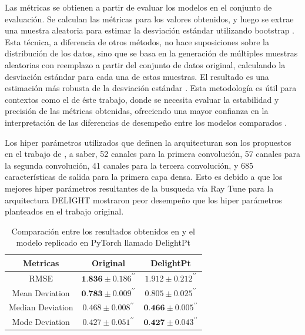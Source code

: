 \documentclass[../tesis.tex]{subfiles}
\begin{document}
Las métricas se obtienen a partir de evaluar los modelos en el conjunto de evaluación. Se calculan las métricas para los valores obtenidos, y luego se extrae una muestra aleatoria para estimar la desviación estándar utilizando bootstrap \cite{bootstrap_std}. Esta técnica, a diferencia de otros métodos, no hace suposiciones sobre la distribución de los datos, sino que se basa en la generación de múltiples muestras aleatorias con reemplazo a partir del conjunto de datos original, calculando la desviación estándar para cada una de estas muestras. El resultado es una estimación más robusta de la desviación estándar \cite{bootstrap_applications}. Esta metodología es útil para contextos como el de éste trabajo, donde se necesita evaluar la estabilidad y precisión de las métricas obtenidas, ofreciendo una mayor confianza en la interpretación de las diferencias de desempeño entre los modelos comparados \cite{bootstrap_methods_and_permutation_tests}.\par\null\par

Los hiper parámetros utilizados que definen la arquitecturan son los propuestos en el trabajo de \cite{delight}, a saber, 52 canales para la primera convolución, 57 canales para la segunda convolución, 41 canales para la tercera convolución, y 685 características de salida para la primera capa densa. Esto es debido a que los mejores hiper parámetros resultantes de la busqueda vía Ray Tune \cite{raytune} para la arquitectura DELIGHT mostraron peor desempeño que los hiper parámetros planteados en el trabajo original.\par\null\par


\begin{table}[h]
    \centering
    \begin{tabular}{|c|c|c|}
        \hline
        Metricas & Original & DelightPt \\ \hline
        RMSE & $\textbf{1.836} \pm 0.186^{\prime \prime}$ & $1.912 \pm 0.212^{\prime \prime}$ \\ \hline
        Mean Deviation & $\textbf{0.783} \pm 0.009^{\prime \prime}$ & $0.805 \pm 0.025^{\prime \prime}$ \\ \hline
        Median Deviation & $0.468 \pm 0.008^{\prime \prime}$ & $\textbf{0.466} \pm 0.005^{\prime \prime}$ \\ \hline
        Mode Deviation & $0.427 \pm 0.051^{\prime \prime}$ & $\textbf{0.427} \pm 0.043^{\prime \prime}$ \\ \hline
    \end{tabular}
    \caption{Comparación entre los resultados obtenidos en \cite{delight} y el modelo replicado en PyTorch llamado DelightPt}
    \label{tab:delight_vs_pytorch}
\end{table}
\end{document}
